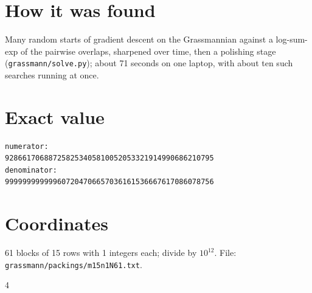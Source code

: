 \documentclass[11pt,a4paper]{article}
\begin{document}
\section{How it was found}
Many random starts of gradient descent on the Grassmannian against a log-sum-exp of the pairwise overlaps, sharpened over time, then a polishing stage (\texttt{grassmann/solve.py}); about 71 seconds on one laptop, with about ten such searches running at once.


\appendix
\section{Exact value}
{\small
\begin{verbatim}
numerator:
928661706887258253405810052053321914990686210795
denominator:
999999999999607204706657036161536667617086078756
\end{verbatim}}

\section{Coordinates}
61 blocks of 15 rows with 1 integers each; divide by $10^{12}$. File: \texttt{grassmann/packings/m15n1N61.txt}.
{\tiny
\begin{multicols}{4}
\end{multicols}}
\end{document}
